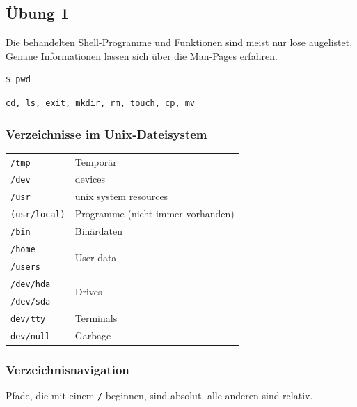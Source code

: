 	\subsection{Übung 1} %
	\label{sub:uebung_1}
	Die behandelten Shell-Programme und Funktionen sind meist nur lose augelistet. Genaue Informationen
	lassen sich über die Man-Pages erfahren.

	\begin{lstlisting}
$ pwd
	\end{lstlisting}

	\begin{lstlisting}
cd, ls, exit, mkdir, rm, touch, cp, mv
	\end{lstlisting}

	\subsubsection*{Verzeichnisse im Unix-Dateisystem} %
	\label{ssub:verzeichnisse_im_unix_dateisystem}

	\begin{tabular}{ll}
		\texttt{/tmp} 			& Temporär\\
		\texttt{/dev} 			& devices\\
		\texttt{/usr} 			& unix system resources\\
		\texttt{(usr/local)} 	& Programme (nicht immer vorhanden)\\
		\texttt{/bin} 			& Binärdaten\\
		\texttt{/home} 			& \multirow{2}{*}{User data}\\
		\texttt{/users} 		&\\
		\texttt{/dev/hda}		& \multirow{2}{*}{Drives}\\
		\texttt{/dev/sda}		&\\
		\texttt{dev/tty}		& Terminals\\
		\texttt{dev/null}		& Garbage
	\end{tabular}


	\subsubsection*{Verzeichnisnavigation} %
	\label{ssub:verzeichnisnavigation}

	Pfade, die mit einem \texttt{/} beginnen, sind absolut, alle anderen sind relativ.
	
